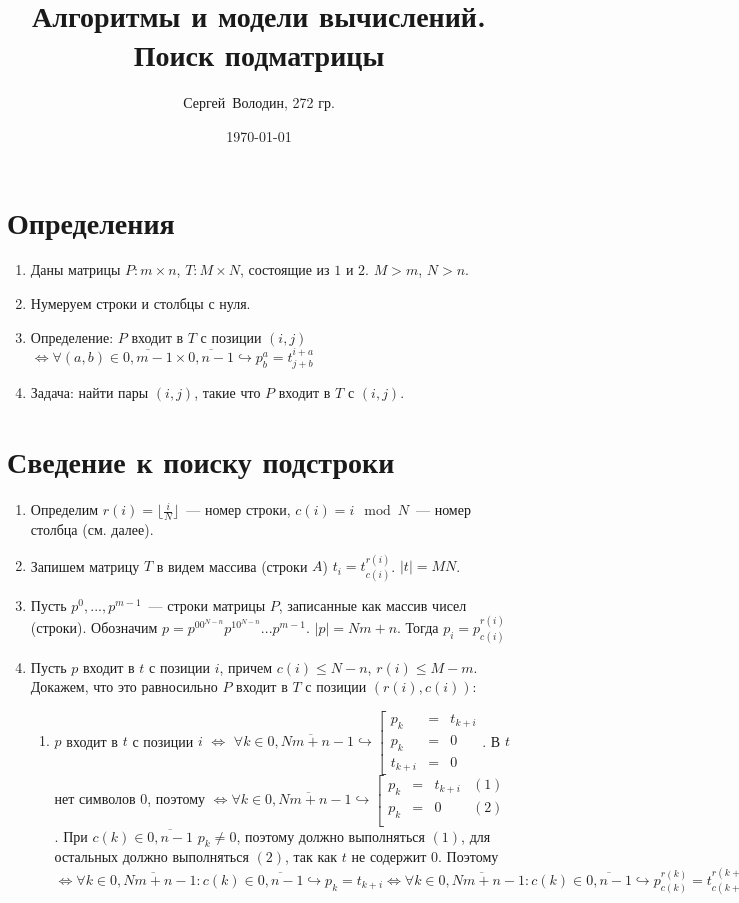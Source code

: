 \documentclass[a4paper]{article}
\date{\today}
\author{Сергей~Володин, 272 гр.}
\title{Алгоритмы и модели вычислений.\\Поиск подматрицы}
\begin{document}
\maketitle
\section{Определения}
\begin{enumerate}
\item Даны матрицы $P\colon m\times n$, $T\colon M\times N$, состоящие из $1$ и $2$. $M>m$, $N>n$.
\item Нумеруем строки и столбцы с нуля.
\item Определение: $P$ входит в $T$ с позиции $(i,j)$ $\Leftrightarrow \forall (a,b)\in\overline{0,m-1}\times\overline{0,n-1}\hookrightarrow p^a_b=t^{i+a}_{j+b}$
\item Задача: найти пары $(i,j)$, такие что $P$ входит в $T$ с $(i,j)$.
\end{enumerate}
\section{Сведение к поиску подстроки}
\begin{enumerate}
\item Определим $r(i)=\lfloor\frac{i}{N}\rfloor$~--- номер строки, $c(i)=i\mod N$~--- номер столбца (см. далее).
\item Запишем матрицу $T$ в видем массива (строки $A$) $t_i=t^{r(i)}_{c(i)}$. $|t|=MN$.
\item Пусть $p^0,...,p^{m-1}$~--- строки матрицы $P$, записанные как массив чисел (строки). Обозначим $p=p^00^{N-n}p^10^{N-n}...p^{m-1}$. $|p|=Nm+n$. Тогда $p_i=p^{r(i)}_{c(i)}$
\item Пусть $p$ входит в $t$ с позиции $i$, причем $c(i)\leqslant N-n$, $r(i)\leqslant M-m$. Докажем, что это равносильно $P$ входит в $T$ с позиции $(r(i),c(i))$:\begin{enumerate}
\item $p$ входит в $t$ с позиции $i$ $\boxed{\Leftrightarrow}$ $\forall k\in\overline{0,Nm+n-1}\hookrightarrow \left[\begin{array}{lcl}
p_k&=&t_{k+i}\\
p_k&=&0\\
t_{k+i}&=&0
\end{array}\right.$. В $t$ нет символов $0$, поэтому $\boxed{\Leftrightarrow}\forall k\in\overline{0,Nm+n-1}\hookrightarrow\left[\begin{array}{lclr}
p_k&=&t_{k+i}&(1)\\
p_k&=&0&(2)\\
\end{array}\right.$. При $c(k)\in\overline{0,n-1}$ $p_k\neq 0$, поэтому должно выполняться $(1)$, для остальных должно выполняться $(2)$, так как $t$ не содержит $0$. Поэтому $\boxed{\Leftrightarrow}\forall k\in\overline{0,Nm+n-1}\colon c(k)\in\overline{0,n-1}\hookrightarrow p_k=t_{k+i}\Leftrightarrow \forall k\in\overline{0,Nm+n-1}\colon c(k)\in\overline{0,n-1}\hookrightarrow p^{r(k)}_{c(k)}=t^{r(k+i)}_{c(k+i)}$
\end{enumerate}
\end{enumerate}
\end{document}
